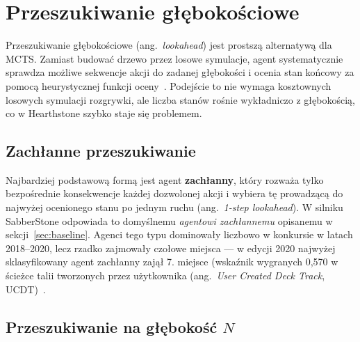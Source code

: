 \section{Przeszukiwanie głębokościowe} \label{sec:lookahead}

Przeszukiwanie głębokościowe (ang.~\textit{lookahead}) jest prostszą alternatywą dla MCTS. Zamiast budować drzewo przez losowe symulacje, agent systematycznie sprawdza możliwe sekwencje akcji do zadanej głębokości i ocenia stan końcowy za pomocą heurystycznej funkcji oceny~\cite{dockhorn2019}. Podejście to nie wymaga kosztownych losowych symulacji rozgrywki, ale liczba stanów rośnie wykładniczo z głębokością, co w Hearthstone szybko staje się problemem.

\subsection{Zachłanne przeszukiwanie}

Najbardziej podstawową formą jest agent \textbf{zachłanny}, który rozważa tylko bezpośrednie konsekwencje każdej dozwolonej akcji i wybiera tę prowadzącą do najwyżej ocenionego stanu po jednym ruchu (ang.~\textit{1-step lookahead}). W silniku SabberStone odpowiada to domyślnemu \textit{agentowi zachłannemu} opisanemu w sekcji~\ref{sec:baseline}. Agenci tego typu dominowały liczbowo w konkursie w latach 2018--2020, lecz rzadko zajmowały czołowe miejsca --- w edycji 2020 najwyżej sklasyfikowany agent zachłanny zajął 7. miejsce (wskaźnik wygranych 0{,}570 w ścieżce talii tworzonych przez użytkownika (ang.~\textit{User Created Deck Track}, UCDT)~\cite{hearthstone_competition}.

\subsection{Przeszukiwanie na głębokość $N$}

